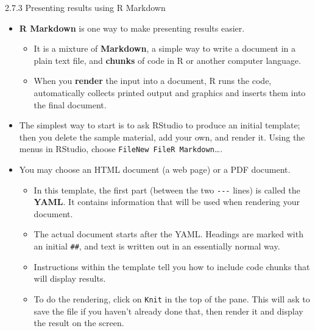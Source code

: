 \documentclass[
  9pt,
  a4paper,
  ignorenonframetext,
  notheorems]{beamer}
\providecommand{\tightlist}{%
  \setlength{\itemsep}{0pt}\setlength{\parskip}{0pt}}\usepackage{longtable,booktabs,array}
\begin{document}
\begin{frame}[fragile]{2.7.3 Presenting results using R Markdown}
\protect\hypertarget{presenting-results-using-r-markdown}{}
\begin{itemize}
\tightlist
\item
  \textbf{R Markdown} is one way to make presenting results easier.

  \begin{itemize}
  \tightlist
  \item
    It is a mixture of \textbf{Markdown}, a simple way to write a
    document in a plain text file, and \textbf{chunks} of code in R or
    another computer language.
  \item
    When you \textbf{render} the input into a document, R runs the code,
    automatically collects printed output and graphics and inserts them
    into the final document.
  \end{itemize}
\end{itemize}

\begin{itemize}
\item
  The simplest way to start is to ask RStudio to produce an initial
  template; then you delete the sample material, add your own, and
  render it. Using the menus in RStudio, choose
  \texttt{File\textbar{}New\ File\textbar{}R\ Markdown}\ldots.
\item
  You may choose an HTML document (a web page) or a PDF document.

  \begin{itemize}
  \tightlist
  \item
    In this template, the first part (between the two \texttt{-\/-\/-}
    lines) is called the \textbf{YAML}. It contains information that
    will be used when rendering your document.
  \item
    The actual document starts after the YAML. Headings are marked with
    an initial \texttt{\#\#}, and text is written out in an essentially
    normal way.
  \item
    Instructions within the template tell you how to include code chunks
    that will display results.
  \item
    To do the rendering, click on \texttt{Knit} in the top of the pane.
    This will ask to save the file if you haven't already done that,
    then render it and display the result on the screen.
  \end{itemize}
\end{itemize}
\end{frame}
\end{document}
